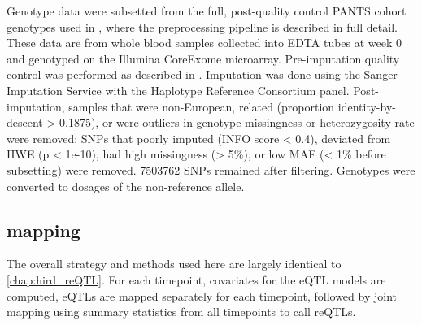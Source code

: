 \begin{outline}
%
%
%
%

Genotype data were subsetted from the full, post-quality control \gls{PANTS} cohort genotypes used in \textcite{sazonovs2019HLADQA105Carriage},
where the preprocessing pipeline is described in full detail.
These data are from whole blood samples collected into EDTA tubes at week 0 and genotyped on the Illumina CoreExome microarray.
Pre-imputation quality control was performed as described in \textcite{delange2017GenomewideAssociationStudy}.
Imputation was done using the Sanger Imputation Service with the Haplotype Reference Consortium panel.
Post-imputation, samples that were non-European, related (proportion identity-by-descent > 0.1875), or were outliers in genotype missingness or heterozygosity rate were removed;
\glspl{SNP} that poorly imputed (INFO score < 0.4), deviated from \gls{HWE} (p < 1e-10), had high missingness (> 5\%), or low \gls{MAF} (< 1\% before subsetting) were removed.
\num{7503762} \glspl{SNP} remained after filtering.
Genotypes were converted to dosages of the non-reference allele.

\subsection{ mapping}

The overall strategy and methods used here are largely identical to \autoref{chap:hird_reQTL}.
For each timepoint, covariates for the \gls{eQTL} models are computed, \glspl{eQTL} are mapped separately for each timepoint, followed by joint mapping using summary statistics from all timepoints to call \glspl{reQTL}.


\end{outline}
